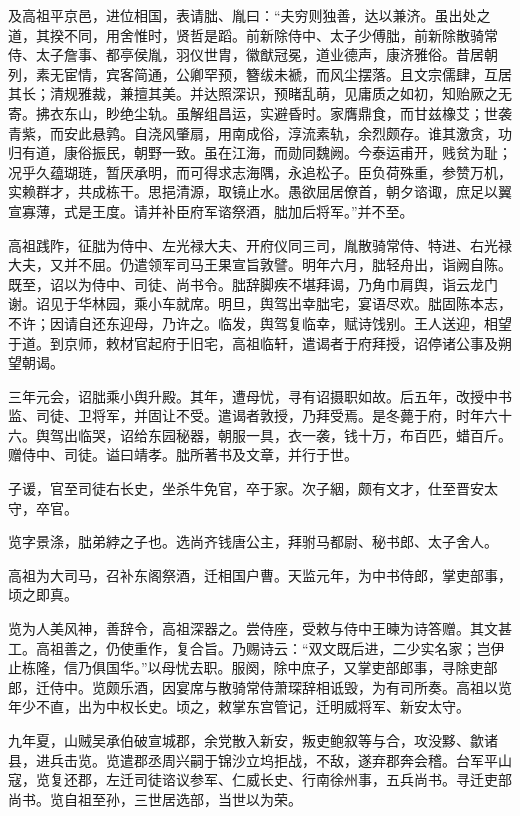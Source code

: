 \documentclass[12pt,UTF8]{ctexbook}
\begin{document}
及高祖平京邑，进位相国，表请朏、胤曰：“夫穷则独善，达以兼济。虽出处之道，其揆不同，用舍惟时，贤哲是蹈。前新除侍中、太子少傅朏，前新除散骑常侍、太子詹事、都亭侯胤，羽仪世胄，徽猷冠冕，道业德声，康济雅俗。昔居朝列，素无宦情，宾客简通，公卿罕预，簪绂未褫，而风尘摆落。且文宗儒肆，互居其长；清规雅裁，兼擅其美。并达照深识，预睹乱萌，见庸质之如初，知贻厥之无寄。拂衣东山，眇绝尘轨。虽解组昌运，实避昏时。家膺鼎食，而甘兹橡艾；世袭青紫，而安此悬鹑。自浇风肇扇，用南成俗，淳流素轨，余烈颇存。谁其激贪，功归有道，康俗振民，朝野一致。虽在江海，而勋同魏阙。今泰运甫开，贱贫为耻；况乎久蕴瑚琏，暂厌承明，而可得求志海隅，永追松子。臣负荷殊重，参赞万机，实赖群才，共成栋干。思挹清源，取镜止水。愚欲屈居僚首，朝夕谘诹，庶足以翼宣寡薄，式是王度。请并补臣府军谘祭酒，朏加后将军。”并不至。

高祖践阼，征朏为侍中、左光禄大夫、开府仪同三司，胤散骑常侍、特进、右光禄大夫，又并不屈。仍遣领军司马王果宣旨敦譬。明年六月，朏轻舟出，诣阙自陈。既至，诏以为侍中、司徒、尚书令。朏辞脚疾不堪拜谒，乃角巾肩舆，诣云龙门谢。诏见于华林园，乘小车就席。明旦，舆驾出幸朏宅，宴语尽欢。朏固陈本志，不许；因请自还东迎母，乃许之。临发，舆驾复临幸，赋诗饯别。王人送迎，相望于道。到京师，敕材官起府于旧宅，高祖临轩，遣谒者于府拜授，诏停诸公事及朔望朝谒。

三年元会，诏朏乘小舆升殿。其年，遭母忧，寻有诏摄职如故。后五年，改授中书监、司徒、卫将军，并固让不受。遣谒者敦授，乃拜受焉。是冬薨于府，时年六十六。舆驾出临哭，诏给东园秘器，朝服一具，衣一袭，钱十万，布百匹，蜡百斤。赠侍中、司徒。谥曰靖孝。朏所著书及文章，并行于世。

子谖，官至司徒右长史，坐杀牛免官，卒于家。次子絪，颇有文才，仕至晋安太守，卒官。

览字景涤，朏弟綍之子也。选尚齐钱唐公主，拜驸马都尉、秘书郎、太子舍人。

高祖为大司马，召补东阁祭酒，迁相国户曹。天监元年，为中书侍郎，掌吏部事，顷之即真。

览为人美风神，善辞令，高祖深器之。尝侍座，受敕与侍中王暕为诗答赠。其文甚工。高祖善之，仍使重作，复合旨。乃赐诗云：“双文既后进，二少实名家；岂伊止栋隆，信乃俱国华。”以母忧去职。服阕，除中庶子，又掌吏部郎事，寻除吏部郎，迁侍中。览颇乐酒，因宴席与散骑常侍萧琛辞相诋毁，为有司所奏。高祖以览年少不直，出为中权长史。顷之，敕掌东宫管记，迁明威将军、新安太守。

九年夏，山贼吴承伯破宣城郡，余党散入新安，叛吏鲍叙等与合，攻没黟、歙诸县，进兵击览。览遣郡丞周兴嗣于锦沙立坞拒战，不敌，遂弃郡奔会稽。台军平山寇，览复还郡，左迁司徒谘议参军、仁威长史、行南徐州事，五兵尚书。寻迁吏部尚书。览自祖至孙，三世居选部，当世以为荣。
\end{document}
